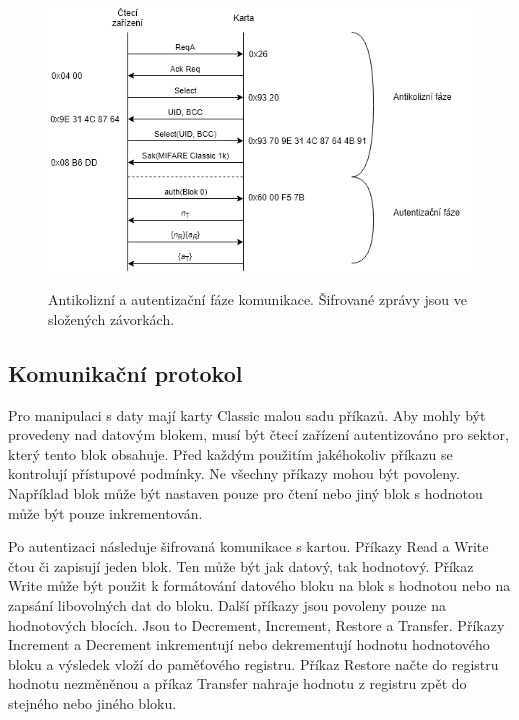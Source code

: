 \begin{figure}[ht]\centering
  \centering
  \includegraphics[width=\linewidth]{obrazky-figures/commDiagram.png}\\[1pt]  
  \caption{Antikolizní a autentizační fáze komunikace. Šifrované zprávy jsou ve složených závorkách.\cite{Dismantling_Mifare_Classic}}    
  \label{obrazekZacatekKomunikace}
\end{figure}

\subsection{Komunikační protokol}
\label{komunikacni_protokol}
\par
Pro manipulaci s daty mají karty Classic malou sadu příkazů. Aby mohly být provedeny nad datovým blokem, musí být čtecí zařízení autentizováno pro sektor, který tento blok obsahuje. Před každým použitím jakéhokoliv příkazu se kontrolují přístupové podmínky. Ne všechny příkazy mohou být povoleny. Například blok může být nastaven pouze pro čtení nebo jiný blok s hodnotou může být pouze inkrementován\cite{PracticalAttackOnMifare}.\par
Po autentizaci následuje šifrovaná komunikace s kartou. Příkazy Read a Write čtou či zapisují jeden blok. Ten může být jak datový, tak hodnotový. Příkaz Write může být použit k formátování datového bloku na blok s hodnotou nebo na zapsání libovolných dat do bloku. Další příkazy jsou povoleny pouze na hodnotových blocích. Jsou to Decrement, Increment, Restore a Transfer. Příkazy Increment a Decrement inkrementují nebo dekrementují hodnotu hodnotového bloku a výsledek vloží do paměťového registru. Příkaz Restore načte do registru hodnotu nezměněnou a příkaz Transfer nahraje hodnotu z registru zpět do stejného nebo jiného bloku\cite{PracticalAttackOnMifare}.

